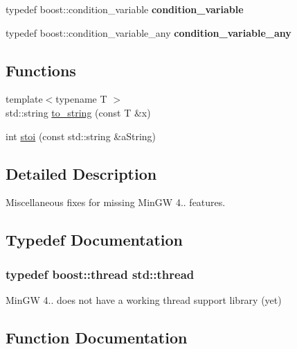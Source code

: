 \begin{DoxyCompactItemize}
\item 
typedef boost\+::condition\+\_\+variable {\bfseries condition\+\_\+variable}\hypertarget{namespacestd_ab892e2ff6c882ab5bfec75eb202613a2}{}\label{namespacestd_ab892e2ff6c882ab5bfec75eb202613a2}

\item 
typedef boost\+::condition\+\_\+variable\+\_\+any {\bfseries condition\+\_\+variable\+\_\+any}\hypertarget{namespacestd_aa9fa80fb08efa0cb495e269b77cdfb7f}{}\label{namespacestd_aa9fa80fb08efa0cb495e269b77cdfb7f}

\end{DoxyCompactItemize}
\subsection*{Functions}
\begin{DoxyCompactItemize}
\item 
{\footnotesize template$<$typename T $>$ }\\std\+::string \hyperlink{namespacestd_ad42a977ebc90223e5dc0b424385e3f1e}{to\+\_\+string} (const T \&x)
\item 
int \hyperlink{namespacestd_a5a4884a3b1890357be19cd6ff56179da}{stoi} (const std\+::string \&a\+String)
\end{DoxyCompactItemize}


\subsection{Detailed Description}
Miscellaneous fixes for missing Min\+GW 4.. features. 

\subsection{Typedef Documentation}
\subsubsection[{\texorpdfstring{thread}{thread}}]{\setlength{\rightskip}{0pt plus 5cm}typedef boost\+::thread {\bf std\+::thread}}\hypertarget{namespacestd_af8ef78a9cf464d7f7faf334b0648cd20}{}\label{namespacestd_af8ef78a9cf464d7f7faf334b0648cd20}
Min\+GW 4.. does not have a working thread support library (yet) 

\subsection{Function Documentation}
